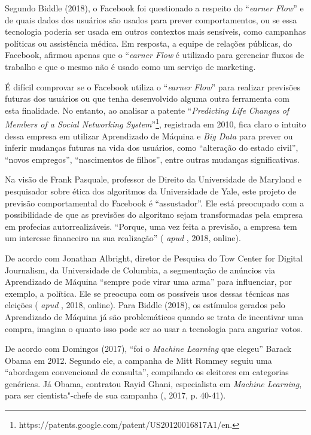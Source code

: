 Segundo Biddle (2018), o Facebook foi questionado a respeito do
``\emph{earner Flow}'' e de quais dados dos usuários são usados para
prever comportamentos, ou se essa tecnologia poderia ser usada em outros
contextos mais sensíveis, como campanhas políticas ou assistência
médica. Em resposta, a equipe de relações públicas, do Facebook, afirmou
apenas que o ``\emph{earner Flow} é utilizado para gerenciar fluxos
de trabalho e que o mesmo não é usado como um serviço de marketing.

É difícil comprovar se o Facebook utiliza o ``\emph{earner Flow}''
para realizar previsões futuras dos usuários ou que tenha desenvolvido
alguma outra ferramenta com esta finalidade. No entanto, ao analisar a
patente ``\emph{Predicting Life Changes of Members of a Social
Networking System}''\footnote{https://patents.google.com/patent/US20120016817A1/en.},
registrada em 2010, fica claro o intuito dessa empresa em utilizar
Aprendizado de Máquina e \emph{Big Data} para prever ou inferir mudanças
futuras na vida dos usuários, como ``alteração do estado civil'',
``novos empregos'', ``nascimentos de filhos'', entre outras mudanças
significativas.

Na visão de Frank Pasquale, professor de Direito da Universidade de
Maryland e pesquisador sobre ética dos algoritmos da Universidade de
Yale, este projeto de previsão comportamental do Facebook é
``assustador''. Ele está preocupado com a possibilidade de que as
previsões do algoritmo sejam transformadas pela empresa em profecias
autorrealizáveis. ``Porque, uma vez feita a previsão, a empresa tem um
interesse financeiro na sua realização'' ( \emph{apud} , 2018,
online).

De acordo com Jonathan Albright, diretor de Pesquisa do Tow Center for
Digital Journalism, da Universidade de Columbia, a segmentação de
anúncios via Aprendizado de Máquina ``sempre pode virar uma arma'' para
influenciar, por exemplo, a política. Ele se preocupa com os possíveis
usos dessas técnicas nas eleições ( \emph{apud} , 2018, online).
Para Biddle (2018), os estímulos gerados pelo Aprendizado de Máquina já
são problemáticos quando se trata de incentivar uma compra, imagina o
quanto isso pode ser ao usar a tecnologia para angariar votos.

De acordo com Domingos (2017), ``foi o \emph{Machine Learning} que
elegeu'' Barack Obama em 2012. Segundo ele, a campanha de Mitt Rommey
seguiu uma ``abordagem convencional de consulta'', compilando os
eleitores em categorias genéricas. Já Obama, contratou Rayid Ghani,
especialista em \emph{Machine Learning}, para ser cientista"-chefe de sua
campanha (, 2017, p. 40-41).

